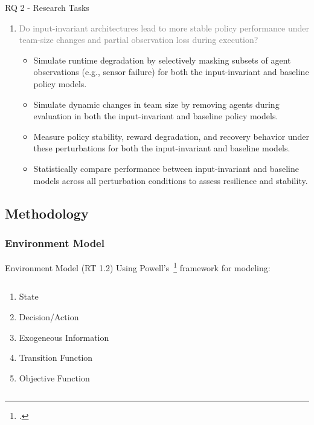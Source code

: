 \begin{frame}{RQ 2 - Research Tasks}
    \begin{enumerate}
        \item[RQ 2] \textcolor{gray}{
            Do input-invariant architectures lead to more stable policy performance under 
            team-size changes and partial observation loss during execution? } \vspace{1em}
    \begin{itemize}
        \item[RT 2.1] {
            Simulate runtime degradation by selectively masking subsets of agent observations 
            (e.g., sensor failure) for both the input-invariant and baseline policy models.}
        \item[RT 2.2] {
            Simulate dynamic changes in team size by removing agents during evaluation 
            in both the input-invariant and baseline policy models.}
        \item[RT 2.3] {
            Measure policy stability, reward degradation, and recovery behavior under these 
            perturbations for both the input-invariant and baseline models.}
        \item[RT 2.4] {
            Statistically compare performance between input-invariant and baseline models 
            across all perturbation conditions to assess resilience and stability.}
    \end{itemize}
    \end{enumerate}
\end{frame}

\subsection{Methodology}

\subsubsection{Environment Model}

\begin{frame}{Environment Model (RT 1.2)}
    Using Powell's~\footcite{powell2022}
    framework for modeling:
    \begin{columns}
        \begin{column}{0.3\linewidth}
            \begin{enumerate}
                \item State
                \item Decision/Action
                \item Exogeneous Information
                \item Transition Function
                \item Objective Function
            \end{enumerate}
        \end{column}
        \begin{column}{0.7\linewidth}
        \end{column}
    \end{columns}
\end{frame}


